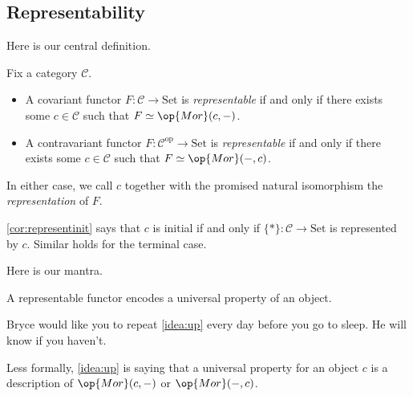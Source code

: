 \documentclass[../notes.tex]{subfiles}
\begin{document}
\subsection{Representability}
Here is our central definition.
\begin{definition}[Representable]
	Fix a category $\mathcal C$.
	\begin{itemize}
		\item A covariant functor $F:\mathcal C\to\mathrm{Set}$ is \textit{representable} if and only if there exists some $c\in\mathcal C$ such that $F\simeq\op{Mor}(c,-)$.
		\item A contravariant functor $F:\mathcal C^{\mathrm{op}}\to\mathrm{Set}$ is \textit{representable} if and only if there exists some $c\in\mathcal C$ such that $F\simeq\op{Mor}(-,c)$.
	\end{itemize}
	In either case, we call $c$ together with the promised natural isomorphism the \textit{representation} of $F$.
\end{definition}
\begin{example}
	\autoref{cor:representinit} says that $c$ is initial if and only if $\{*\}:\mathcal C\to\mathrm{Set}$ is represented by $c$. Similar holds for the terminal case.
\end{example}
Here is our mantra.
\begin{idea} \label{idea:up}
	A representable functor encodes a universal property of an object.
\end{idea}
\begin{remark}
	Bryce would like you to repeat \autoref{idea:up} every day before you go to sleep. He will know if you haven't.
\end{remark}
Less formally, \autoref{idea:up} is saying that a universal property for an object $c$ is a description of $\op{Mor}(c,-)$ or $\op{Mor}(-,c)$.
\end{document}
